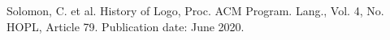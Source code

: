 \documentclass[
12pt,		%
openright,	%
twoside,  %
a4paper,			%
chapter=TITLE,		%
english,			%
french,				%
spanish,			%
brazil				%
]{USPSC-classe/USPSC}
\begin{document}
\begin{flushleft}
\begin{flushleft}
\begin{flushleft}
\begin{flushleft}
\begin{flushleft}
\begin{flushleft}
\begin{flushleft}
\begin{flushleft}
\begin{flushleft}
\begin{flushleft}
[SOLOMON et al., 2020] Solomon, C. et al. History of Logo, Proc. ACM Program. Lang., Vol. 4, No. HOPL, Article 79. Publication date: June 2020.
\end{flushleft}


\end{flushleft}


\end{flushleft}


\end{flushleft}


\end{flushleft}


\end{flushleft}


\end{flushleft}


\end{flushleft}


\end{flushleft}


\end{flushleft}
\end{document}
